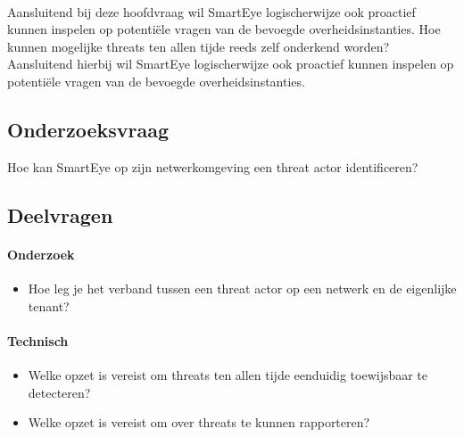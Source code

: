 \paragraph{}
Aansluitend bij deze hoofdvraag wil SmartEye logischerwijze ook proactief kunnen inspelen op potentiële vragen van de bevoegde overheidsinstanties. Hoe kunnen mogelijke threats ten allen tijde reeds zelf onderkend worden?
Aansluitend hierbij wil SmartEye logischerwijze ook proactief kunnen inspelen op potentiële vragen van de bevoegde overheidsinstanties.

\subsection{Onderzoeksvraag}
Hoe kan SmartEye op zijn netwerkomgeving een threat actor identificeren?

\subsection{Deelvragen}
\paragraph{Onderzoek}
\begin{itemize}
    \item Hoe leg je het verband tussen een threat actor op een netwerk en de eigenlijke tenant?
\end{itemize}

\paragraph{Technisch}
\begin{itemize}
    \item Welke opzet is vereist om threats ten allen tijde eenduidig toewijsbaar te detecteren?
    \item Welke opzet is vereist om over threats te kunnen rapporteren?
\end{itemize}



